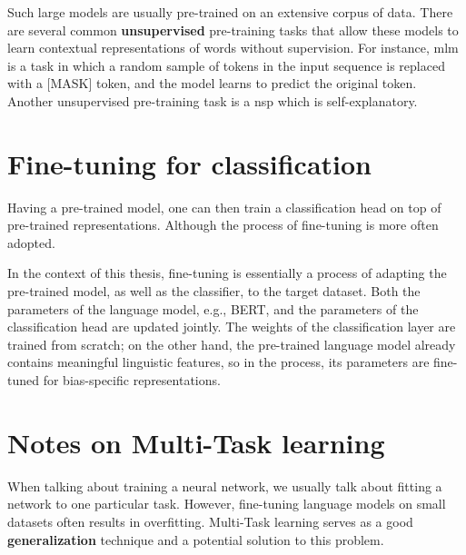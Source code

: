 Such large models are usually pre-trained on an extensive corpus of data. There are several common \textbf{unsupervised} pre-training tasks that allow these models to learn contextual representations of words without supervision. For instance, \gls{mlm} is a task in which a random sample of tokens in the input sequence is replaced with a [MASK] token, and the model learns to predict the original token. Another unsupervised pre-training task is a \gls{nsp} which is self-explanatory.





\section{Fine-tuning for classification}\label{finetuning}
Having a pre-trained model, one can then train a classification head
on top of pre-trained representations. Although the process of fine-tuning
is more often adopted.

In the context of this thesis, fine-tuning is essentially a process of adapting the pre-trained model, as well as the classifier, to the target dataset. Both the parameters of the language model, e.g., BERT, and the parameters of the classification head are updated jointly. The weights of the classification layer are trained from scratch; on the other hand, the pre-trained language model already contains
meaningful linguistic features, so in the process, its parameters are fine-tuned
for bias-specific representations.




\section{Notes on Multi-Task learning}\label{mtl}
When talking about training a neural network, we usually talk about fitting a network to one particular task. However, fine-tuning language models on small datasets often results in overfitting. Multi-Task learning \cite{caruana1997multitask} serves as a good \textbf{generalization} technique and a potential solution to this problem.

